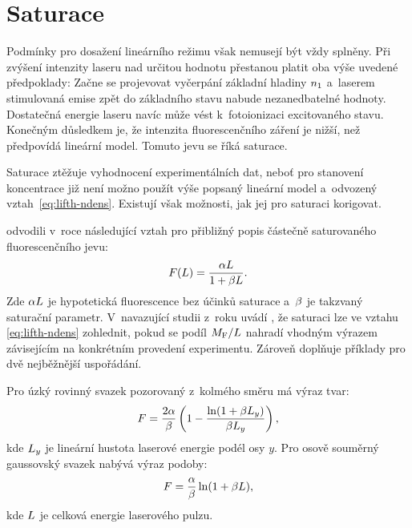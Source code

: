 \section{Saturace}
\label{sec:lifth-saturation}
Podmínky pro dosažení lineárního režimu však nemusejí být vždy splněny.
Při zvýšení intenzity laseru nad určitou hodnotu přestanou platit oba
výše uvedené předpoklady:
Začne se projevovat vyčerpání základní hladiny $n_1$
a~laserem stimulovaná emise zpět do základního stavu nabude nezanedbatelné
hodnoty.
Dostatečná energie laseru navíc může vést k~fotoionizaci excitovaného stavu.
Konečným důsledkem je, že intenzita fluorescenčního záření je nižší,
než předpovídá lineární model.
Tomuto jevu se říká saturace.

Saturace ztěžuje vyhodnocení experimentálních dat, neboť pro stanovení
koncentrace již není možno použít výše popsaný lineární model
a~odvozený vztah~\eqref{eq:lifth-ndens}.
Existují však možnosti, jak jej pro saturaci korigovat.

 odvodili v~roce \citeyear{lif-saturation}
následující vztah pro přibližný popis částečně saturovaného
fluorescenčního jevu\autocite{lif-saturation}:
\begin{equation}
	F(L) = \frac{\alpha L}{1 + \beta L}.
\end{equation}
Zde $\alpha L$ je hypotetická fluorescence bez účinků saturace
a~$\beta$ je takzvaný saturační parametr.
V~navazující studii z~roku \citeyear{lif-pb} uvádí \citeauthor{lif-pb},
že saturaci lze ve vztahu \eqref{eq:lifth-ndens} zohlednit,
pokud se podíl $M_\text{F}/L$ nahradí vhodným výrazem
závisejícím na konkrétním provedení experimentu.
Zároveň doplňuje příklady pro dvě nejběžnější uspořádání.%
\autocite{lif-pb}

Pro úzký rovinný svazek pozorovaný z~kolmého směru má výraz tvar:
\begin{equation}
	\label{eq:lifth-sheet}
	F = \frac{2\alpha}{\beta}
	\left( 1 - \frac{\ln(1 + \beta L_y)}{\beta L_y} \right),
\end{equation}
kde $L_y$ je lineární hustota laserové energie podél osy $y$.
Pro osově souměrný gaussovský svazek nabývá výraz podoby:
\begin{equation}
	\label{eq:lifth-cylindric}
	F = \frac{\alpha}{\beta}
	\ln(1 + \beta L),
\end{equation}
kde $L$ je celková energie laserového pulzu.
